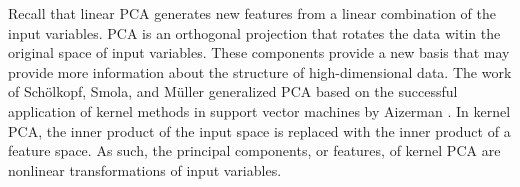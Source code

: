 Recall that linear PCA generates new features from a linear combination of the input variables.
PCA is an orthogonal projection that rotates the data witin the original space of input variables.
These components provide a new basis that may provide more information about the structure of high-dimensional data.
The work of Sch\"olkopf, Smola, and M\"uller \cite{scholkopf1997kernel,scholkopf1998nonlinear} generalized PCA based on the successful application of kernel methods in support vector machines by Aizerman \cite{aizerman1964theoretical}.
In kernel PCA, the inner product of the input space is replaced with the inner product of a feature space.
As such, the principal components, or features, of kernel PCA are nonlinear transformations of input variables.

